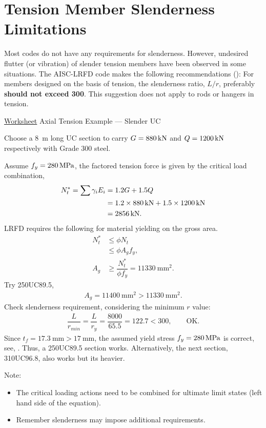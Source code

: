 \section{Tension Member Slenderness Limitations}
Most codes do not have any requirements for slenderness. However, undesired flutter (or vibration) of slender tension members have been observed in some situations. The AISC-LRFD code makes the following recommendations (): For members designed on the basis of tension, the slenderness ratio, $L/r$, preferably \textbf{should not exceed 300}. This suggestion does not apply to rods or hangers in tension.
\begin{exmp}\href{run:./WORKSHEET/CH03/EX3.ATUC.sm}{Worksheet}
Axial Tension Example --- Slender UC

Choose a \SI{8}{\meter} long UC section to carry $G=\SI{880}{\kilo\newton}$ and $Q=\SI{1200}{\kilo\newton}$ respectively with Grade 300 steel.
\end{exmp}
\begin{solution}
Assume $f_y=\SI{280}{\mega\pascal}$, the factored tension force is given by the critical load combination,
\begin{align*}
N^*_t=\sum\gamma_iE_i&=1.2G+1.5Q\\
&=1.2\times\SI{880}{\kilo\newton}+1.5\times\SI{1200}{\kilo\newton}\\
&=\SI{2856}{\kilo\newton}.
\end{align*}
LRFD requires the following for material yielding on the gross area.
\begin{align*}
N^*_t&\leqslant\phi{}N_t\\
&\leqslant\phi{}A_gf_y,\\
A_g&\geqslant\dfrac{N^*_t}{\phi{}f_y}=\SI{11330}{\mm^2}.
\end{align*}
Try 250UC89.5,
\begin{gather*}
A_g=\SI{11400}{\mm^2}>\SI{11330}{\mm^2}.
\end{gather*}
Check slenderness requirement, considering the minimum $r$ value:
\begin{gather*}
\dfrac{L}{r_{min}}=\dfrac{L}{r_y}=\dfrac{8000}{65.5}=\num{122.7}<\num{300},\qquad\text{OK.}
\end{gather*}
Since $t_f=\SI{17.3}{\mm}>\SI{17}{\mm}$, the assumed yield stress $f_y=\SI{280}{\mega\pascal}$ is correct, see, . Thus, a 250UC89.5 section works. Alternatively, the next section, 310UC96.8, also works but its heavier.

Note:
\begin{itemize}
\item The critical loading actions need to be combined for ultimate limit states (left hand side of the equation).
\item Remember slenderness may impose additional requirements.
\end{itemize}
\end{solution}

